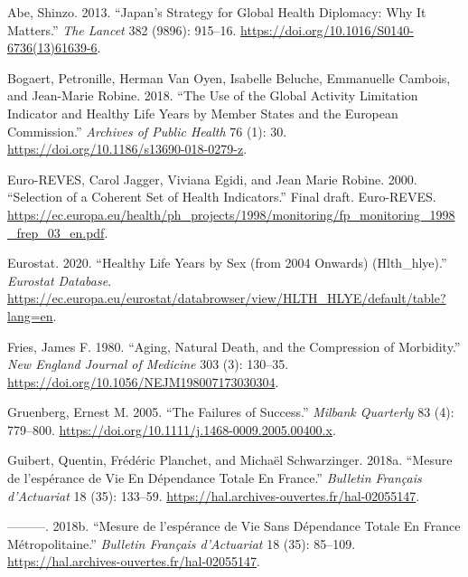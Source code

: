 \documentclass{article}
\newlength{\cslhangindent}
\newlength{\cslentryspacingunit} %
\newenvironment{CSLReferences}[2] %
 {%
  \setlength{\parindent}{0pt}
  \ifodd #1
  \let\oldpar\par
  \def\par{\hangindent=\cslhangindent\oldpar}
  \fi
  \setlength{\parskip}{#2\cslentryspacingunit}
 }%
 {}
\begin{document}
\hypertarget{refs}{}
\begin{CSLReferences}{1}{0}
\leavevmode{}%
Abe, Shinzo. 2013. {``Japan's Strategy for Global Health Diplomacy: Why
It Matters.''} \emph{The Lancet} 382 (9896): 915--16.
\url{https://doi.org/10.1016/S0140-6736(13)61639-6}.

\leavevmode{}%
Bogaert, Petronille, Herman Van Oyen, Isabelle Beluche, Emmanuelle
Cambois, and Jean-Marie Robine. 2018. {``The Use of the Global Activity
Limitation {Indicator} and Healthy Life Years by Member States and the
{European} {Commission}.''} \emph{Archives of Public Health} 76 (1): 30.
\url{https://doi.org/10.1186/s13690-018-0279-z}.

\leavevmode{}%
Euro-REVES, Carol Jagger, Viviana Egidi, and Jean Marie Robine. 2000.
{``Selection of a {Coherent} {Set} of {Health} {Indicators}.''} Final
draft. Euro-REVES.
\url{https://ec.europa.eu/health/ph_projects/1998/monitoring/fp_monitoring_1998_frep_03_en.pdf}.

\leavevmode{}%
Eurostat. 2020. {``Healthy Life Years by Sex (from 2004 Onwards)
(Hlth\_hlye).''} \emph{Eurostat Database}.
\url{https://ec.europa.eu/eurostat/databrowser/view/HLTH_HLYE/default/table?lang=en}.

\leavevmode{}%
Fries, James F. 1980. {``Aging, {Natural} {Death}, and the {Compression}
of {Morbidity}.''} \emph{New England Journal of Medicine} 303 (3):
130--35. \url{https://doi.org/10.1056/NEJM198007173030304}.

\leavevmode{}%
Gruenberg, Ernest M. 2005. {``The {Failures} of {Success}.''}
\emph{Milbank Quarterly} 83 (4): 779--800.
\url{https://doi.org/10.1111/j.1468-0009.2005.00400.x}.

\leavevmode{}%
Guibert, Quentin, Frédéric Planchet, and Michaël Schwarzinger. 2018a.
{``Mesure de l'espérance de Vie En Dépendance Totale En France.''}
\emph{Bulletin Français d'Actuariat} 18 (35): 133--59.
\url{https://hal.archives-ouvertes.fr/hal-02055147}.

\leavevmode{}%
---------. 2018b. {``Mesure de l'espérance de Vie Sans Dépendance Totale
En {France} Métropolitaine.''} \emph{Bulletin Français d'Actuariat} 18
(35): 85--109. \url{https://hal.archives-ouvertes.fr/hal-02055147}.


\end{CSLReferences}
\end{document}
